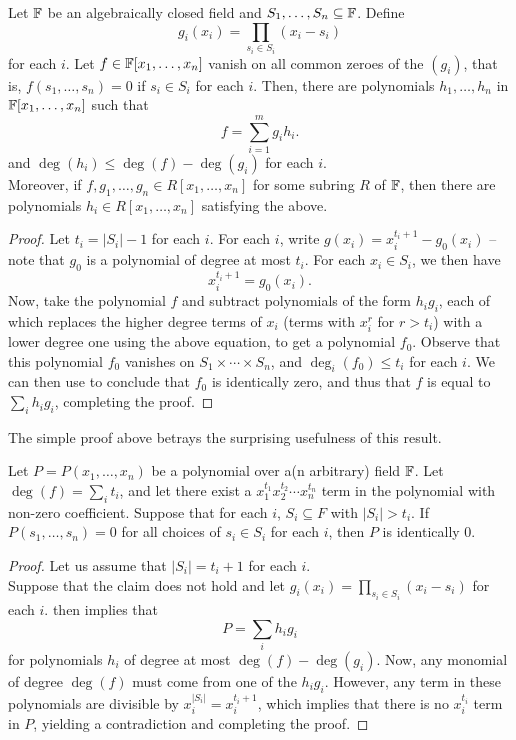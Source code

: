 	\begin{ftheo}
		\label{thm: comb null}
		Let $\mathbb{F}$ be an algebraically closed field and $S_1,\ldots,S_n \subseteq \mathbb{F}$. Define
		\[ g_i(x_i) = \prod_{s_i \in S_i} (x_i - s_i) \]
		for each $i$. Let $f \in \mathbb{F}[x_1,\ldots,x_n]$ vanish on all common zeroes of the $(g_i)$, that is, $f(s_1,\ldots,s_n) = 0$ if $s_i \in S_i$ for each $i$. Then, there are polynomials $h_1,\ldots,h_n$ in $\mathbb{F}[x_1,\ldots,x_n]$ such that
		\[ f = \sum_{i=1}^{m} g_i h_i. \]
		and $\deg(h_i) \le \deg(f) - \deg(g_i)$ for each $i$.\\
		Moreover, if $f,g_1,\ldots,g_n \in R[x_1,\ldots,x_n]$ for some subring $R$ of $\mathbb{F}$, then there are polynomials $h_i \in R[x_1,\ldots,x_n]$ satisfying the above.
	\end{ftheo}
	\begin{proof}
		Let $t_i = |S_i| - 1$ for each $i$. For each $i$, write $g(x_i) = x_i^{t_i+1} - g_0(x_i)$ -- note that $g_0$ is a polynomial of degree at most $t_i$. For each $x_i \in S_i$, we then have
		\[ x_i^{t_i + 1} = g_0(x_i). \]
		Now, take the polynomial $f$ and subtract polynomials of the form $h_i g_i$, each of which replaces the higher degree terms of $x_i$ (terms with $x_i^{r}$ for $r > t_i$) with a lower degree one using the above equation, to get a polynomial $f_0$. Observe that this polynomial $f_0$ vanishes on $S_1 \times \cdots \times S_n$, and $\deg_i(f_0) \le t_i$ for each $i$. We can then use  to conclude that $f_0$ is identically zero, and thus that $f$ is equal to $\sum_i h_i g_i$, completing the proof.
	\end{proof}

	The simple proof above betrays the surprising usefulness of this result.

	\begin{fcor}
		\label{thm: cube-vanishing}
		Let $P = P(x_1,\ldots,x_n)$ be a polynomial over a(n arbitrary) field $\mathbb{F}$. Let $\deg(f) = \sum_i t_i$, and let there exist a $x_1^{t_1} x_2^{t_2} \cdots x_n^{t_n}$ term in the polynomial with non-zero coefficient. Suppose that for each $i$, $S_i \subseteq F$ with $|S_i| > t_i$. If $P(s_1,\ldots,s_n) = 0$ for all choices of $s_i \in S_i$ for each $i$, then $P$ is identically $0$. 
	\end{fcor}
	\begin{proof}
		Let us assume that $|S_i| = t_i + 1$ for each $i$.\\
		Suppose that the claim does not hold and let $g_i(x_i) = \prod_{s_i \in S_i} (x_i - s_i)$ for each $i$.  then implies that
		\[ P = \sum_i h_i g_i \]
		for polynomials $h_i$ of degree at most $\deg(f) - \deg(g_i)$. Now, any monomial of degree $\deg(f)$ must come from one of the $h_i g_i$. However, any term in these polynomials are divisible by $x_i^{|S_i|} = x_i^{t_i + 1}$, which implies that there is no $x_i^{t_i}$ term in $P$, yielding a contradiction and completing the proof.
	\end{proof}